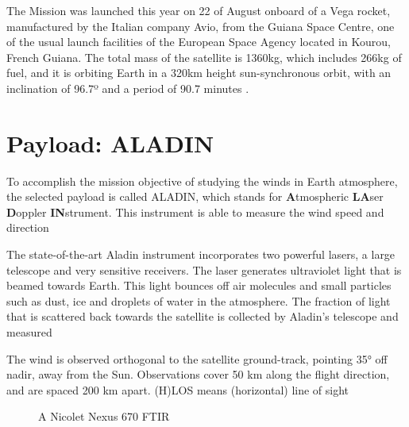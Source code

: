 The Mission was launched this year on 22 of August onboard of a Vega rocket, manufactured
by the Italian company Avio, from the Guiana Space Centre, one of the usual launch
facilities of the European Space Agency located in Kourou, French Guiana. The total
mass of the satellite is 1360kg, which includes 266kg of fuel, and it is orbiting
Earth in a 320km height sun-synchronous orbit, with an inclination of 96.7º and a period
of 90.7 minutes \cite{aeolus_n2yo.com}.

\section{Payload: ALADIN}

To accomplish the mission objective of studying the winds in Earth atmosphere, the
selected payload is called ALADIN, which stands for \textbf{A}tmospheric \textbf{LA}ser
\textbf{D}oppler \textbf{IN}strument. This instrument is able to measure the
wind speed and direction


The state-of-the-art Aladin instrument incorporates two powerful lasers, a large telescope and very sensitive receivers. The laser generates ultraviolet light that is beamed towards Earth. This light bounces off air molecules and small particles such as dust, ice and droplets of water in the atmosphere. The fraction of light that is scattered back towards the satellite is collected by Aladin’s telescope and measured


The wind is observed orthogonal to the satellite ground-track, pointing 35° off nadir, away from the Sun. Observations cover 50 km along the flight direction, and are spaced 200 km apart.
(H)LOS means (horizontal) line of sight

\begin{figure}[h]
	\centering
	\caption{A Nicolet Nexus 670 FTIR}
	\label{fig:machinery}
\end{figure}
